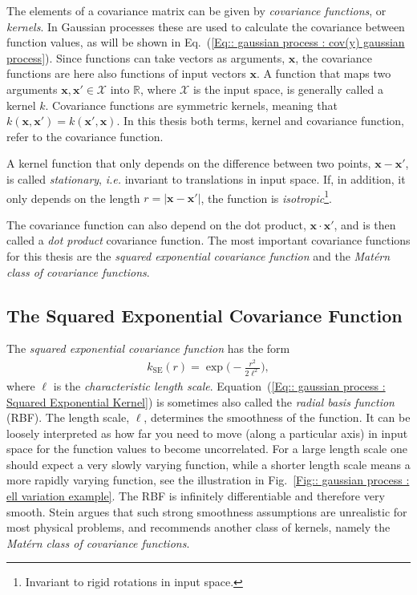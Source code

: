 \documentclass[twoside,english]{uiofysmaster}
\begin{document}
{{The elements of a covariance matrix can be given by \textit{covariance functions}, or \textit{kernels}. In Gaussian processes these are used to calculate the covariance between function values, as will be shown in Eq.~(\ref{Eq:: gaussian process : cov(y) gaussian process}). Since functions can take vectors as arguments, $\textbf{x}$, the covariance functions are here also functions of input vectors $\textbf{x}$. A function that maps two arguments $\textbf{x},\textbf{x}' \in \mathcal{X}$ into $\mathbb{R}$, where $\mathcal{X}$ is the input space, is generally called a kernel $k$. Covariance functions are symmetric kernels, meaning that $k(\textbf{x}, \textbf{x}') = k(\textbf{x}', \textbf{x})$. In this thesis both terms, kernel and covariance function, refer to the covariance function. 


A kernel function that only depends on the difference between two points, $\textbf{x}-\textbf{x}'$, is called \textit{stationary}, \textit{i.e.} invariant to translations in input space. If, in addition, it only depends on the length $r=|\textbf{x}-\textbf{x}'|$, the function is \textit{isotropic}\footnote{Invariant to rigid rotations in input space.}.  

The covariance function can also depend on the dot product, $\textbf{x} \cdot \textbf{x}'$, and is then called a \textit{dot product} covariance function. The most important covariance functions for this thesis are the \textit{squared exponential covariance function} and the \textit{Mat\'{e}rn class of covariance functions}.




\subsection{The Squared Exponential Covariance Function}

The \textit{squared exponential covariance function} has the form 
\begin{align}\label{Eq:: gaussian process : Squared Exponential Kernel}
k_{\mathrm{SE}} (r) = \exp \Big( - \frac{r^2}{2 \ell^2} \Big),
\end{align} 
where $\ell$ is the \textit{characteristic length scale}. Equation~(\ref{Eq:: gaussian process : Squared Exponential Kernel}) is sometimes also called the \textit{radial basis function} (RBF). The length scale, $\ell$, determines the smoothness of the function. It can be loosely interpreted as how far you need to move (along a particular axis) in input space for the function values to become uncorrelated. For a large length scale one should expect a very slowly varying function, while a shorter length scale means a more rapidly varying function, see the illustration in Fig.~\ref{Fig:: gaussian process : ell variation example}. The RBF is infinitely differentiable and therefore very smooth. Stein \cite{stein2012interpolation} argues that such strong smoothness assumptions are unrealistic for most physical problems, and recommends another class of kernels, namely the \textit{Mat\'{e}rn class of covariance functions}.

}}
\end{document}
